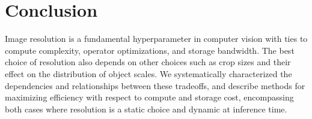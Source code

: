 %

\section{Conclusion}
Image resolution is a fundamental hyperparameter in computer vision with ties to compute complexity, operator optimizations, and storage bandwidth.
The best choice of resolution also depends on other choices such as crop sizes and their effect on the distribution of object scales.
We systematically characterized the dependencies and relationships between these tradeoffs, and describe methods for maximizing efficiency with respect to compute and storage cost, encompassing both cases where resolution is a static choice and dynamic at inference time.

%
%
%
%
%



